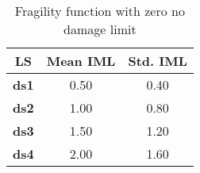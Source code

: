 \begin{table}[htbp]

\centering
\begin{tabular}{ c c c }

\hline
\rowcolor{anti-flashwhite}
\bf{LS} & \bf{Mean IML} & \bf{Std. IML} \\
\hline
\bf{ds1} & 0.50 & 0.40 \\
\bf{ds2} & 1.00 & 0.80 \\
\bf{ds3} & 1.50 & 1.20 \\
\bf{ds4} & 2.00 & 1.60 \\
\hline
\end{tabular}

\caption{Fragility function with zero no damage limit}
\label{tab:ff-cont-tax1-zmin}
\end{table}